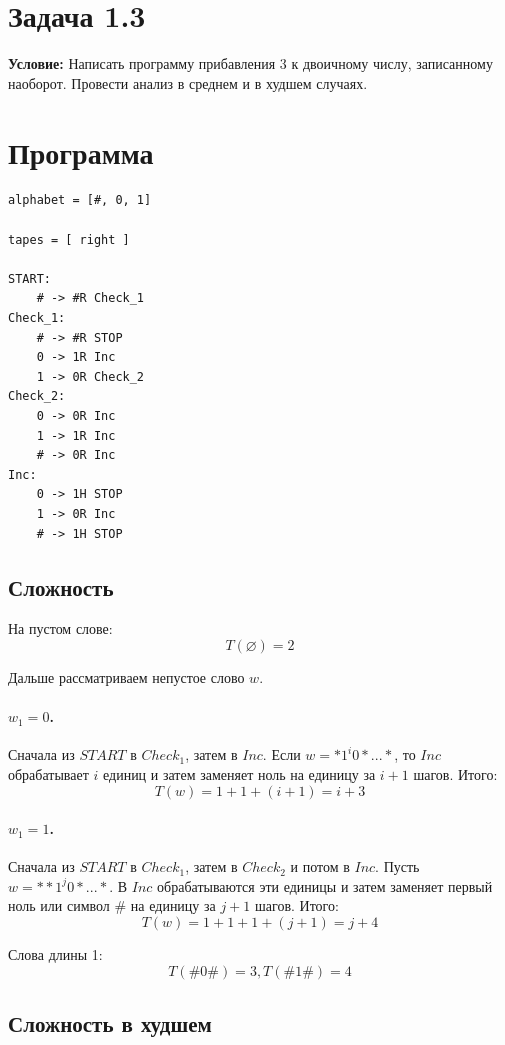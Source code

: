 \documentclass[12pt]{article}
\begin{document}
\section*{Задача 1.3}

\textbf{Условие:} Написать программу прибавления $3$ к двоичному
числу, записанному наоборот. Провести анализ в среднем и в худшем
случаях.

\section*{Программа}

\begin{verbatim}
alphabet = [#, 0, 1]

tapes = [ right ]

START:
    # -> #R Check_1
Check_1:
    # -> #R STOP
    0 -> 1R Inc
    1 -> 0R Check_2
Check_2:
    0 -> 0R Inc
    1 -> 1R Inc
    # -> 0R Inc
Inc:
    0 -> 1H STOP
    1 -> 0R Inc
    # -> 1H STOP
\end{verbatim}

\subsection*{Сложность}

На пустом слове:
\[
T(\varnothing)=2
\]

Дальше рассматриваем непустое слово $w$.

\paragraph{$w_1=0$.}

Сначала из $START$ в $Check_1$, затем в $Inc$. Если $w=*1^i0*...*$, то $Inc$ обрабатывает $i$ единиц и затем заменяет ноль на единицу за $i+1$ шагов. Итого:
\[
T(w)=1+1+(i+1)=i+3
\]

\paragraph{$w_1=1$.}

Сначала из $START$ в $Check_1$, затем в $Check_2$ и потом в $Inc$. 
Пусть $w = **1^j0*...*$. В $Inc$ обрабатываются эти единицы и затем
заменяет первый ноль или символ $\#$ на единицу за $j+1$ шагов. Итого:
\[
T(w)=1+1+1+(j+1)=j+4
\]

Слова длины 1:
\[
T(\#0\#)=3, T(\#1\#)=4
\]

\subsection*{Сложность в худшем}
\end{document}
